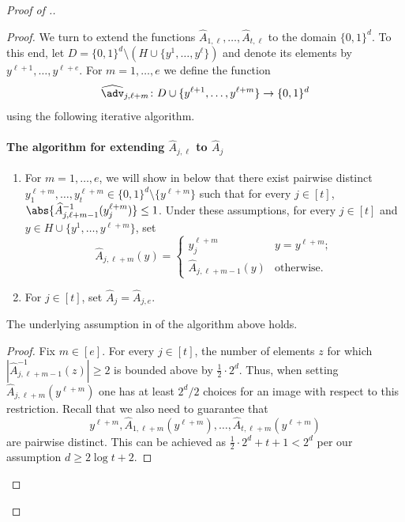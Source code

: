 \begin{proof}[Proof of .]
\begin{proof}
We turn to extend the functions $\widehat{A}_{1,\ell}, \ldots, \widehat{A}_{t,\ell}$ to the domain $\{0,1\}^d$. To this end,
let $D = \{0,1\}^d \setminus (H \cup \{y^1,\ldots,y^\ell\})$ and denote its elements by $y^{\ell+1},\ldots,y^{\ell+e}$. For $m=1,\ldots,e$ we define the function \[
\widehat{\adv}_{j,\ell+m} \colon D \cup \{y^{\ell+1},\ldots, y^{\ell+m}\} \to \{0,1\}^d
\]
using the following iterative algorithm.

%
\paragraph{The algorithm for extending $\widehat{A}_{j,\ell}$ to $\widehat{A}_{j}$}
\begin{enumerate}
%
	\item\label{It:assump21} For $m = 1,\ldots, e$, we will show in  below that there exist pairwise distinct $y^{\ell+m}_{1},\ldots,y^{\ell+m}_{t}\in \{0,1\}^d \setminus \{y^{\ell+m}\}$ such that for every $j \in [t]$, $\abs{\widehat{A}_{j,\ell+m-1}^{-1}(y^{\ell+m}_{j})} \le 1$. Under these assumptions, for every $j \in [t]$ and $y \in H \cup \{y^{1},\ldots, y^{\ell+m}\}$, set 
	\[\widehat{A}_{j,\ell+m}(y) = \begin{cases}
	y^{\ell+m}_{j} &  y = y^{\ell+m}; \\
	\widehat{A}_{j,\ell+m-1}(y) & \text{otherwise}.
	\end{cases}\]
	\item\label{It:assump22} For $j \in [t]$, set $\widehat{A}_{j} = \widehat{A}_{j,e}$.
	

	
\end{enumerate}

\begin{claim}\label{c:step 3}
	The underlying assumption in  of the algorithm above holds.
\end{claim}

\begin{proof}
	Fix $m \in [e]$. For every $j \in [t]$, the number of elements $z$ for which $|\widehat{A}^{-1}_{j,\ell+m-1}(z)| \ge 2$ is bounded above by $\frac1{2} \cdot 2^d$. Thus, when setting $\widehat{A}_{j,\ell+m}(y^{\ell+m})$ one has at least $2^d/2$ choices for an image with respect to this restriction. Recall that we also need to guarantee that
	\[
	y^{\ell+m}, \widehat{A}_{1,\ell+m}(y^{\ell+m}),\ldots,\widehat{A}_{t,\ell+m}(y^{\ell+m})\]
	are pairwise distinct. This can be achieved as $\frac1{2} \cdot 2^d+t+1 < 2^d$ per our assumption $d \ge 2\log{t}+2$.
\end{proof}


\end{proof}
\end{proof}
